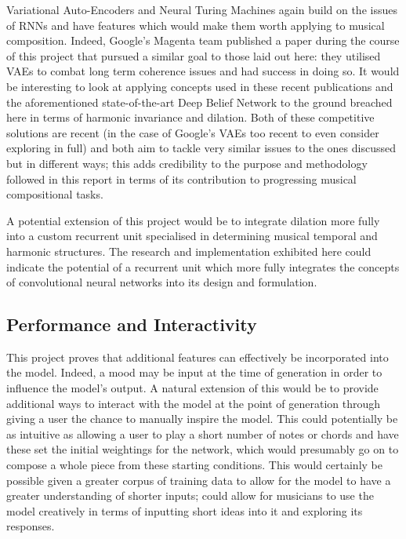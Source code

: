 \documentclass[12pt,]{article}
\begin{document}
Variational Auto-Encoders and Neural Turing Machines again build on the
issues of RNNs and have features which would make them worth applying to
musical composition. Indeed, Google's Magenta team published a paper
during the course of this project that pursued a similar goal to those
laid out here: they utilised VAEs to combat long term coherence issues
and had success in doing so. It would be interesting to look at applying
concepts used in these recent publications and the aforementioned
state-of-the-art Deep Belief Network to the ground breached here in
terms of harmonic invariance and dilation. Both of these competitive
solutions are recent (in the case of Google's VAEs too recent to even
consider exploring in full) and both aim to tackle very similar issues
to the ones discussed but in different ways; this adds credibility to
the purpose and methodology followed in this report in terms of its
contribution to progressing musical compositional tasks.

A potential extension of this project would be to integrate dilation
more fully into a custom recurrent unit specialised in determining
musical temporal and harmonic structures. The research and
implementation exhibited here could indicate the potential of a
recurrent unit which more fully integrates the concepts of convolutional
neural networks into its design and formulation.

\hypertarget{performance-and-interactivity}{%
\subsection{Performance and
Interactivity}\label{performance-and-interactivity}}

This project proves that additional features can effectively be
incorporated into the model. Indeed, a mood may be input at the time of
generation in order to influence the model's output. A natural extension
of this would be to provide additional ways to interact with the model
at the point of generation through giving a user the chance to manually
inspire the model. This could potentially be as intuitive as allowing a
user to play a short number of notes or chords and have these set the
initial weightings for the network, which would presumably go on to
compose a whole piece from these starting conditions. This would
certainly be possible given a greater corpus of training data to allow
for the model to have a greater understanding of shorter inputs; could
allow for musicians to use the model creatively in terms of inputting
short ideas into it and exploring its responses.
\end{document}
